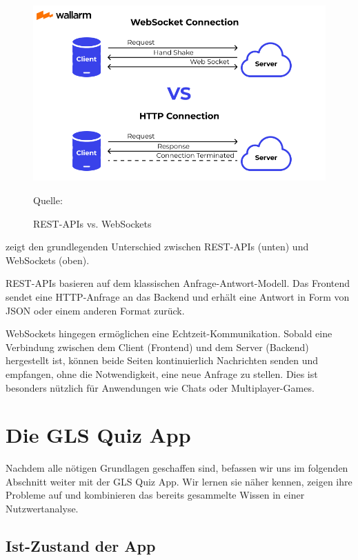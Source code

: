\documentclass[biblatex]{lni}
\begin{document}
\begin{figure}
  \centering
  \includegraphics[width=.8\textwidth]{communication}
  \caption{REST-APIs vs. WebSockets}
  \label{fig:communication}
  \vspace{-0.3cm}
  \begin{center}
    \footnotesize Quelle: \cite{WebCon}
  \end{center}
\end{figure}

 zeigt den grundlegenden Unterschied zwischen \ac{REST}-\ac{API}s (unten) und WebSockets (oben).

\ac{REST}-\ac{API}s basieren auf dem klassischen Anfrage-Antwort-Modell.
Das Frontend sendet eine \ac{HTTP}-Anfrage an das Backend und erhält eine Antwort in Form von \ac{JSON} oder einem anderen Format zurück.

WebSockets hingegen ermöglichen eine Echtzeit-Kommunikation.
Sobald eine Verbindung zwischen dem Client (Frontend) und dem Server (Backend) hergestellt ist,
können beide Seiten kontinuierlich Nachrichten senden und empfangen, ohne die Notwendigkeit, eine neue Anfrage zu stellen.
Dies ist besonders nützlich für Anwendungen wie Chats oder Multiplayer-Games.

\section{Die GLS Quiz App}

Nachdem alle nötigen Grundlagen geschaffen sind, befassen wir uns im folgenden Abschnitt weiter mit der GLS Quiz App.
Wir lernen sie näher kennen, zeigen ihre Probleme auf und kombinieren das bereits gesammelte Wissen in einer Nutzwertanalyse.

\subsection{Ist-Zustand der App}
\end{document}
